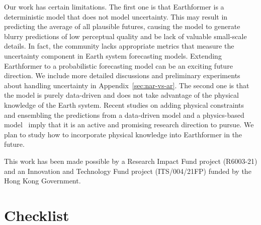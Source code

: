 \documentclass{article}
\begin{document}
Our work has certain limitations.
The first one is that Earthformer is a deterministic model that does not model uncertainty. This may result in predicting the average of all plausible futures, causing the model to generate blurry predictions of low perceptual quality and be lack of valuable small-scale details. In fact, the community lacks appropriate metrics that measure the uncertainty component in Earth system forecasting models. Extending Earthformer to a probabilistic forecasting model can be an exciting future direction.
We include more detailed discussions and preliminary experiments about handling uncertainty in Appendix~\ref{sec:nar-vs-ar}.
The second one is that the model is purely data-driven and does not take advantage of the physical knowledge of the Earth system. Recent studies on adding physical constraints~\cite{krishnapriyan2021characterizing,negiar2022learning} and ensembling the predictions from a data-driven model and a physics-based model~\cite{ravuri2021skilful} imply that it is an active and promising research direction to pursue. We plan to study how to incorporate physical knowledge into Earthformer in the future.






\begin{ack}
This work has been made possible by a Research Impact Fund project (R6003-21) and an Innovation and Technology Fund project (ITS/004/21FP) funded by the Hong Kong Government.
\end{ack}




\newpage
\section*{Checklist}
\end{document}
